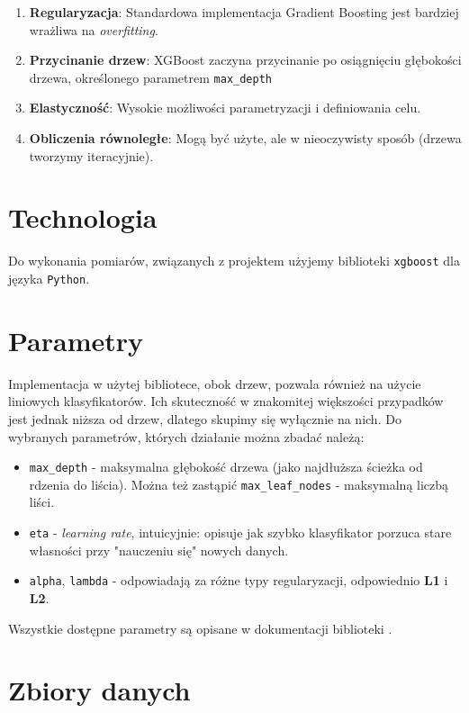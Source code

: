 \documentclass[a4paper,12p]{article}
\begin{document}
\begin{enumerate}
	\item \textbf{Regularyzacja}: Standardowa implementacja Gradient Boosting jest bardziej wrażliwa na \textit{overfitting}.
	\item \textbf{Przycinanie drzew}: XGBoost zaczyna przycinanie po osiągnięciu głębokości drzewa, określonego parametrem \texttt{max\_depth}
	\item \textbf{Elastyczność}: Wysokie możliwości parametryzacji i definiowania celu.
	\item \textbf{Obliczenia równoległe}: Mogą być użyte, ale w nieoczywisty sposób \cite{parallel} (drzewa tworzymy iteracyjnie).
\end{enumerate}


\section{Technologia}

Do wykonania pomiarów, związanych z projektem użyjemy biblioteki \texttt{xgboost} dla języka \texttt{Python}.

\section{Parametry}

Implementacja w użytej bibliotece, obok drzew, pozwala również na użycie liniowych klasyfikatorów. Ich skuteczność w znakomitej większości przypadków jest jednak niższa od drzew, dlatego skupimy się wyłącznie na nich. Do wybranych parametrów, których działanie można zbadać należą:

\begin{itemize}
	\item \texttt{max\_depth} - maksymalna głębokość drzewa (jako najdłuższa ścieżka od rdzenia do liścia). Można też zastąpić \texttt{max\_leaf\_nodes} - maksymalną liczbą liści.
	\item \texttt{eta} - \textit{learning rate}, intuicyjnie: opisuje jak szybko klasyfikator porzuca stare własności przy "nauczeniu się" nowych danych.
	\item \texttt{alpha}, \texttt{lambda} - odpowiadają za różne typy regularyzacji, odpowiednio \textbf{L1} i \textbf{L2}. 
\end{itemize}

Wszystkie dostępne parametry są opisane w dokumentacji biblioteki \cite{github}.

\section{Zbiory danych}
\end{document}
